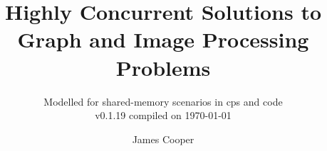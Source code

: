 \documentclass[newzealand,10pt,partial,draft,doublespace]{aucklandthesis}
\theoremstyle{plain}
\begin{document}

%
%
%

\title{Highly Concurrent Solutions to Graph and Image Processing Problems}
\subtitle{Modelled for shared-memory scenarios in \gls{cps} and code \\ {\small v0.1.19 compiled on \today}}
\author{James Cooper}

\maketitle




\cleardoublepage\tableofcontents
\cleardoublepage\listoffigures
\cleardoublepage\listoftables
\cleardoublepage\listofcprulesetfloats
\cleardoublepage\listofcpobjectsfloats
\cleardoublepage\listoffixmes


%
%
%
%

\mainmatter
\end{document}
